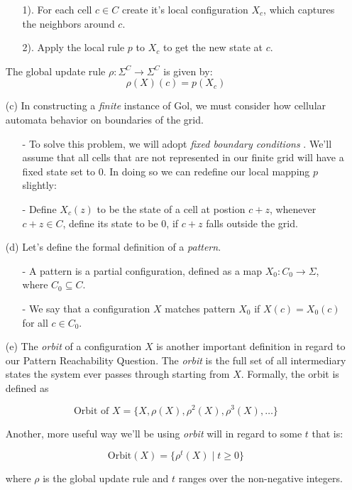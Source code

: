 \documentclass{article}
\theoremstyle{definition}
\theoremstyle{plain}
\theoremstyle{plain}
\begin{document}
\begin{enumerate}
\begin{enumerate}
          \item[1).] For each cell $c \in C$ create it's local configuration $X_c$, which captures the neighbors around $c$.
          \item[2).] Apply the local rule $p$ to $X_c$ to get the new state at $c$.
        \end{enumerate}
        The global update rule $\rho : \Sigma^C \to \Sigma^C$ is  given by:
        \begin {equation}
        \rho(X)(c) = p(X_c)
        \end {equation}
      \item[(c)] In constructing a \textit{finite} instance of Gol, we must consider how cellular automata behavior on boundaries of the grid.
        \begin{enumerate}
          \item[-] To solve this problem, we will adopt \textit{fixed boundary conditions} \cite{SUTNER199587}. We'll assume that all cells that are not represented in our finite grid will have a fixed state set to $0$. In doing so we can redefine our local mapping $p$ slightly: 
          \item[-] Define $X_c(z)$ to be the state of a cell at postion $c + z$, whenever $c + z \in C$, define its state to be 0, if $c + z$ falls outside the grid.
        \end{enumerate}
      \item[(d)] Let's define the formal definition of a \textit{pattern}. \cite{SUTNER199587}
        \begin{enumerate}
           \item[-] A pattern is a partial configuration, defined as a map $X_0: C_0 \to \Sigma$, where $C_0 \subseteq C$.
    \item[-] We say that a configuration $X$ matches pattern $X_0$ if $X(c) = X_0(c)$ for all $c \in C_0$.
        \end{enumerate}

\item[(e)] The \textit{orbit} of a configuration $X$ is another important definition in regard to our Pattern Reachability Question. The \textit{orbit} is the full set of all intermediary states the system ever passes through starting from $X$. Formally, the orbit is defined as

\begin{equation}
  \text{Orbit of } X = \{ X, \rho(X), \rho^2(X), \rho^3(X), \dots \}
\end{equation}

Another, more useful way we'll be using \textit{orbit} will in regard to some $t$ that is: 

\begin{equation}
\text{Orbit}(X) = \{ \rho^t(X) \mid t \geq 0 \}
\end{equation}

where \( \rho \) is the global update rule and \( t \) ranges over the non-negative integers.
\end{enumerate}
\end{document}
